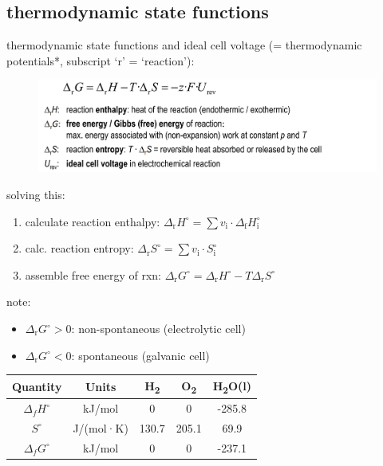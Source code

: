 \documentclass[a4paper,10pt,landscape]{scrartcl}
\begin{document}
\begin{multicols*}{3}
\subsection{thermodynamic state functions}
thermodynamic state functions and ideal cell voltage
(= thermodynamic potentials*, subscript ‘r’ = ‘reaction’):
\vspace{-.5cm}
\begin{figure}[H]
    \centering
    \includegraphics[width=1\linewidth]{src/gibbs_1.png}
    \label{fig:gibbs_1}
\end{figure}
\vspace{-1cm}
solving this:
\begin{enumerate}
    \item calculate reaction enthalpy: $\Delta_{\mathrm{r}} H^{\circ}=\sum v_{\mathrm{i}} \cdot \Delta_{\mathrm{f}} H_{\mathrm{i}}^{\circ}$
    \item calc. reaction entropy: $\Delta_{\mathrm{r}} S^{\circ}=\sum v_{\mathrm{i}} \cdot S_{\mathrm{i}}^{\circ}$
    \item assemble free energy of rxn: $\Delta_{\mathrm{r}} G^{\circ} = \Delta_{\mathrm{r}} H^{\circ}- T\Delta_{\mathrm{r}} S^{\circ}$
\end{enumerate}
note:
\begin{itemize}
\item $\Delta_{\mathrm{r}} G^{\circ}> 0$: non-spontaneous (electrolytic cell)
\item $\Delta_{\mathrm{r}} G^{\circ}<0$: spontaneous (galvanic cell)
\end{itemize}
\begin{tabular}{|c|c|c|c|c|}
\hline
\textbf{Quantity} & \textbf{Units} & \textbf{H\textsubscript{2}} & \textbf{O\textsubscript{2}} & \textbf{H\textsubscript{2}O(l)} \\ \hline
$\Delta_fH^\circ$ & kJ/mol        & 0    & 0    & -285.8  \\ \hline
$S^\circ$        & J/(mol·K)      & 130.7 & 205.1 & 69.9    \\ \hline
$\Delta_fG^\circ$ & kJ/mol        & 0    & 0    & -237.1  \\ \hline
\end{tabular}

\end{multicols*}
\end{document}
